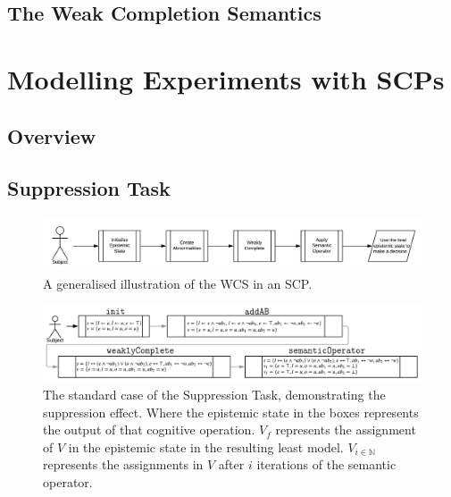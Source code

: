 \documentclass[
11pt, %
english, %
singlespacing, %
headsepline, %
]{MastersDoctoralThesis} %
\begin{document}
\section{The Weak Completion Semantics}



\chapter{Modelling Experiments with SCPs}
\section{Overview}
\section{Suppression Task}

\begin{figure}
\begin{center}
 \centering \includegraphics[width=\linewidth]{suppressionSCP_overview}
\caption{A generalised illustration of the WCS in an SCP. }
\label {fig:supoverview}
\end{center}
\end{figure}

\begin{figure}
\begin{center}
 \centering \includegraphics[width=\linewidth]{suppressionSCP_normal}
\caption{The standard case of the Suppression Task, demonstrating the suppression effect. Where the epistemic state in the boxes represents the output of that cognitive operation. $V_f$ represents the assignment of $V$ in the epistemic state in the resulting least model. $V_{i\in \mathbb{N}}$ represents the assignments in $V$ after $i$ iterations of the semantic operator.}
\label {fig:supnormal}
\end{center}
\end{figure}
\end{document}

